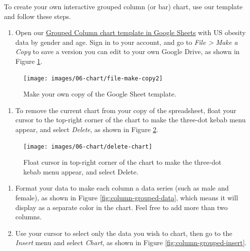 \documentclass[
  english,
]{book}
\providecommand{\tightlist}{%
  \setlength{\itemsep}{0pt}\setlength{\parskip}{0pt}}
\begin{document}
To create your own interactive grouped column (or bar) chart, use our template and follow these steps.

\begin{enumerate}
\def\labelenumi{\arabic{enumi}.}
\tightlist
\item
  Open our \href{https://docs.google.com/spreadsheets/d/1ltA9siijVSDkTE3fzB3UaWHO7dotBIrGH4R9wI_Qyqw/}{Grouped Column chart template in Google Sheets} with US obesity data by gender and age. Sign in to your account, and go to \emph{File \textgreater{} Make a Copy} to save a version you can edit to your own Google Drive, as shown in Figure \ref{fig:file-make-copy2}.
\end{enumerate}



\begin{figure}
\texttt{[image: images/06-chart/file-make-copy2]} \caption{Make your own copy of the Google Sheet template.}\label{fig:file-make-copy2}
\end{figure}

\begin{enumerate}
\def\labelenumi{\arabic{enumi}.}
\setcounter{enumi}{1}
\tightlist
\item
  To remove the current chart from your copy of the spreadsheet, float your cursor to the top-right corner of the chart to make the three-dot kebab menu appear, and select \emph{Delete}, as shown in Figure \ref{fig:delete-chart}.
\end{enumerate}



\begin{figure}
\texttt{[image: images/06-chart/delete-chart]} \caption{Float cursor in top-right corner of the chart to make the three-dot kebab menu appear, and select Delete.}\label{fig:delete-chart}
\end{figure}

\begin{enumerate}
\def\labelenumi{\arabic{enumi}.}
\setcounter{enumi}{2}
\item
  Format your data to make each column a data series (such as male and female), as shown in Figure \ref{fig:column-grouped-data}, which means it will display as a separate color in the chart. Feel free to add more than two columns.
\item
  Use your cursor to select only the data you wish to chart, then go to the \emph{Insert} menu and select \emph{Chart}, as shown in Figure \ref{fig:column-grouped-insert}.
\end{enumerate}
\end{document}
